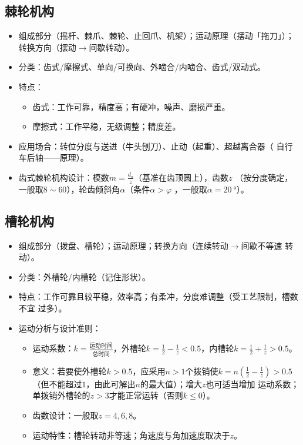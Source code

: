\documentclass[12pt,a4paper]{article}
\newcommand{\tightlist}{\setlength{\parskip}{0pt}\setlength{\itemsep}{0pt}}
\newcommand{\hint}[1]{\textsf{（#1）}}
\newcommand{\minor}[1]{{\color{gray} #1}}
\newcommand{\then}{$\to$}
\begin{document}
\subsection{棘轮机构}
\begin{itemize}\tightlist
    \item 组成部分\hint{摇杆、棘爪、棘轮、止回爪、机架}；运动原理\hint{摆动「拖刀」}；
    转换方向\hint{摆动\then 间歇转动}。
    \item 分类：齿式/摩擦式、单向/可换向、外啮合/内啮合、齿式/双动式。
    \item 特点：
    \begin{itemize}\tightlist
        \item 齿式：工作可靠，精度高；有硬冲，噪声、磨损严重。
        \item 摩擦式：工作平稳，无级调整；精度差。
    \end{itemize}
    \item 应用场合：转位分度与送进\hint{牛头刨刀}、止动\hint{起重}、超越离合器\hint{
    自行车后轴——原理}。
    \item 齿式棘轮机构设计：模数$m=\frac{d_a}{z}$\hint{基准在齿顶圆上}，齿数$z$
    \hint{按分度确定，一般取$8\sim60$}，轮齿倾斜角$\alpha$\hint{条件$\alpha>\varphi$
    ，一般取$\alpha=\SI{20}{\degree}$}。
\end{itemize}

\subsection{槽轮机构}
\begin{itemize}\tightlist
    \item 组成部分\hint{拨盘、槽轮}；运动原理；转换方向\hint{连续转动\then 间歇不等速
    转动}。
    \item 分类：外槽轮/内槽轮\hint{记住形状}。
    \item 特点：工作可靠且较平稳，效率高；有柔冲，分度难调整\hint{受工艺限制，槽数不宜
    过多}。
    \item 运动分析与设计准则：
    \begin{itemize}\tightlist
        \item 运动系数：$k=\frac{\text{运动时间}}{\text{总时间}}$，外槽轮$k=\frac12
        -\frac1z<0.5$，内槽轮$k=\frac12+\frac1z>0.5$。
        \item 意义：若要使外槽轮$k>0.5$，应采用$n>1$个拨销使$k=n\left(\frac12-\frac%
        1z\right)>0.5$\hint{但不能超过$1$，由此可解出$n$的最大值}；增大$z$也可适当增加
        运动系数；单拨销外槽轮的$z>3$才能正常运转\hint{否则$k\leq0$}。
        \item 齿数设计：一般取$z=4,6,8$。
        \item \minor{运动特性：槽轮转动非等速；角速度与角加速度取决于$z$。}
    \end{itemize}
\end{itemize}
\end{document}
